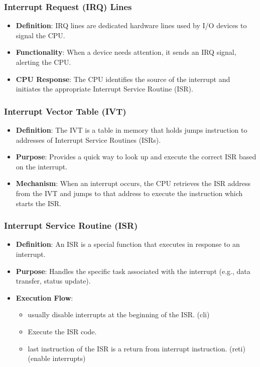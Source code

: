 \begin{frame}
    \frametitle{Interrupt Request (IRQ) Lines}

    \begin{itemize}
        \item \textbf{Definition}: IRQ lines are dedicated hardware lines used by I/O devices to signal the CPU.
        \item \textbf{Functionality}: When a device needs attention, it sends an IRQ signal, alerting the CPU.
        \item \textbf{CPU Response}: The CPU identifies the source of the interrupt and initiates the appropriate Interrupt Service Routine (ISR).
    \end{itemize}
\end{frame}

\begin{frame}
    \frametitle{Interrupt Vector Table (IVT)}

    \begin{itemize}
        \item \textbf{Definition}: The IVT is a table in memory that holds jumps instruction to addresses of Interrupt Service Routines (ISRs).
        \item \textbf{Purpose}: Provides a quick way to look up and execute the correct ISR based on the interrupt.
        \item \textbf{Mechanism}: When an interrupt occurs, the CPU retrieves the ISR address from the IVT and jumps to that address to execute the instruction which starts the ISR.
    \end{itemize}
\end{frame}

\begin{frame}
    \frametitle{Interrupt Service Routine (ISR)}

    \begin{itemize}
        \item \textbf{Definition}: An ISR is a special function that executes in response to an interrupt.
        \item \textbf{Purpose}: Handles the specific task associated with the interrupt (e.g., data transfer, status update).
        \item \textbf{Execution Flow}:
            \begin{itemize}
                \item usually disable interrupts at the beginning of the ISR. (cli)
                \item Execute the ISR code.
                \item last instruction of the ISR is a return from interrupt instruction. (reti) (enable interrupts)
            \end{itemize}
    \end{itemize}
\end{frame}

